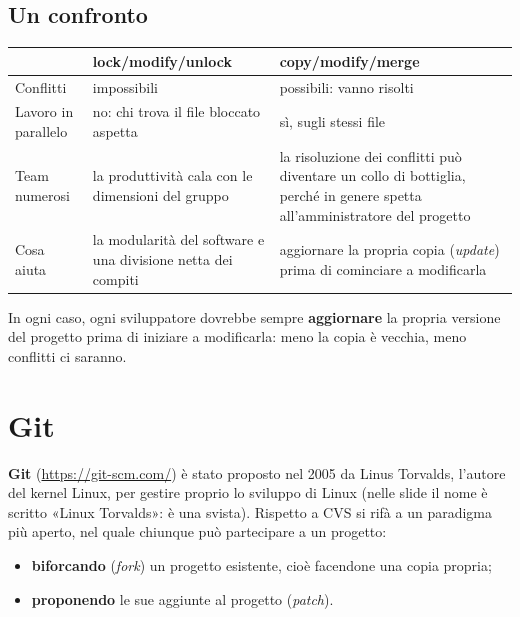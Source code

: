 \subsection{Un confronto}

\begin{center}
\renewcommand{\arraystretch}{1.3}
\begin{tabular}{@{}P{3.2cm}P{5.4cm}P{5.4cm}@{}}
  \toprule
  & \textbf{lock/modify/unlock} & \textbf{copy/modify/merge} \\ \midrule
  Conflitti & impossibili & possibili: vanno risolti \\
  Lavoro in parallelo & no: chi trova il file bloccato aspetta & sì, sugli stessi file \\
  Team numerosi & la produttività cala con le dimensioni del gruppo & la risoluzione dei conflitti può diventare un collo
    di bottiglia, perché in genere spetta all'amministratore del progetto \\
  Cosa aiuta & la modularità del software e una divisione netta dei compiti & aggiornare la propria copia
    (\textit{update}) prima di cominciare a modificarla \\
  \bottomrule
\end{tabular}
\end{center}

In ogni caso, ogni sviluppatore dovrebbe sempre \textbf{aggiornare} la propria versione del progetto prima di iniziare a
modificarla: meno la copia è vecchia, meno conflitti ci saranno.

\section{Git}

\textbf{Git} (\url{https://git-scm.com/}) è stato proposto nel 2005 da Linus Torvalds, l'autore del kernel Linux, per
gestire proprio lo sviluppo di Linux (nelle slide il nome è scritto «Linux Torvalds»: è una svista). Rispetto a CVS si
rifà a un paradigma più aperto, nel quale chiunque può partecipare a un progetto:

\begin{itemize}
  \item \textbf{biforcando} (\textit{fork}) un progetto esistente, cioè facendone una copia propria;
  \item \textbf{proponendo} le sue aggiunte al progetto (\textit{patch}).
\end{itemize}

